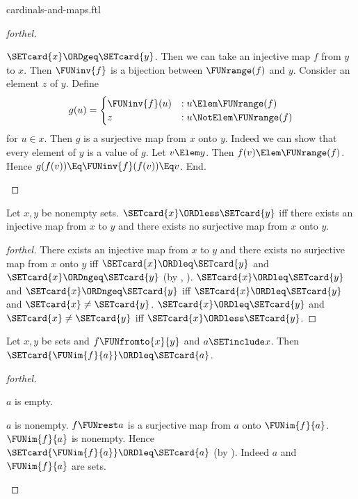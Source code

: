 \documentclass{stex}
\begin{document}
\begin{smodule}{cardinals-and-maps.ftl}
\begin{proof}[forthel]
  \begin{case}{$\SETcard{x} \ORDgeq \SETcard{y}$.}
    Then we can take an injective map $f$ from $y$ to $x$.
    Then $\FUNinv{f}$ is a bijection between $\FUNrange(f)$ and $y$.
    Consider an element $z$ of $y$.
    Define \[ g(u) =
      \begin{cases}
        \FUNinv{f}(u) & : u \Elem \FUNrange(f) \\
        z         & : u \NotElem \FUNrange(f)
      \end{cases} \]
    for $u \in x$.
    Then $g$ is a surjective map from $x$ onto $y$.
    Indeed we can show that every element of $y$ is a value of $g$.
      Let $v \Elem y$.
      Then $f(v) \Elem \FUNrange(f)$.
      Hence $g(f(v)) \Eq \FUNinv{f}(f(v)) \Eq v$.
    End.
  \end{case}
\end{proof}

\begin{proposition}[forthel]
  Let $x, y$ be nonempty sets.
  $\SETcard{x} \ORDless \SETcard{y}$ iff there exists an injective map from $x$ to $y$ and there exists no surjective map from $x$ onto $y$.
\end{proposition}
\begin{proof}[forthel]
  There exists an injective map from $x$ to $y$ and there exists no surjective map from $x$ onto $y$ iff $\SETcard{x} \ORDleq \SETcard{y}$ and $\SETcard{x} \ORDngeq \SETcard{y}$ (by , ).
  $\SETcard{x} \ORDleq \SETcard{y}$ and $\SETcard{x} \ORDngeq \SETcard{y}$ iff $\SETcard{x} \ORDleq \SETcard{y}$ and $\SETcard{x} \neq \SETcard{y}$.
  $\SETcard{x} \ORDleq \SETcard{y}$ and $\SETcard{x} \neq \SETcard{y}$ iff $\SETcard{x} \ORDless \SETcard{y}$.
\end{proof}


\begin{proposition}[forthel,name=cardinality of image]
  Let $x, y$ be sets and $f \FUNfromto{x}{y}$ and $a \SETinclude x$.
  Then $\SETcard{\FUNim{f}{a}} \ORDleq \SETcard{a}$.
\end{proposition}
\begin{proof}[forthel]
  \begin{case}{$a$ is empty.} \end{case}

  \begin{case}{$a$ is nonempty.}
    $f \FUNrest a$ is a surjective map from $a$ onto $\FUNim{f}{a}$.
    $\FUNim{f}{a}$ is nonempty.
    Hence $\SETcard{\FUNim{f}{a}} \ORDleq \SETcard{a}$ (by ).
    Indeed $a$ and $\FUNim{f}{a}$ are sets.
  \end{case}
\end{proof}
\end{smodule}
\end{document}
